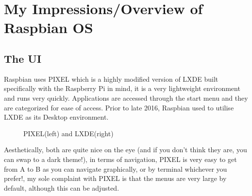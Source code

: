 \documentclass{article}
\begin{document}
	\newpage
	\section{My Impressions/Overview of Raspbian OS}
	\subsection{The UI}
	Raspbian uses PIXEL which is a highly modified version of LXDE built specifically with the Raspberry Pi in mind, it is a very lightweight environment and runs very quickly. Applications are accessed through the start menu and they are categorized for ease of access. Prior to late 2016, Raspbian used to utilise LXDE as its Desktop environment.
	\begin{figure}[h!]
		\centering
		\caption{PIXEL(left) and LXDE(right)\citep{anthony}}
	\end{figure}
	Aesthetically, both are quite nice on the eye (and if you don't think they are, you can swap to a dark theme!), in terms of navigation, PIXEL is very easy to get from A to B as you can navigate graphically, or by terminal whichever you prefer!, my sole complaint with PIXEL is that the menus are very large by default, although this can be adjusted.
\end{document}
